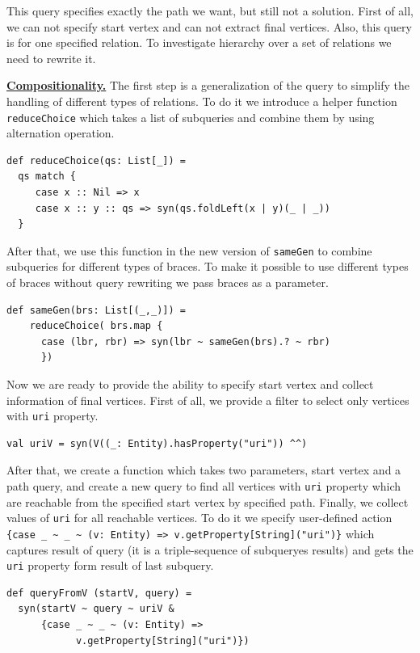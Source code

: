 This query specifies exactly the path we want, but still not a solution.
First of all, we can not specify start vertex and can not extract final vertices.
Also, this query is for one specified relation.
To investigate hierarchy over a set of relations we need to rewrite it.

\underline{\textbf{Compositionality.}}
The first step is a generalization of the query to simplify the handling of different types of relations.
To do it we introduce a helper function \verb|reduceChoice| which takes a list of subqueries and combine them by using alternation operation.

\begin{lstlisting}
def reduceChoice(qs: List[_]) =
  qs match {
     case x :: Nil => x
     case x :: y :: qs => syn(qs.foldLeft(x | y)(_ | _))
  }
\end{lstlisting}

After that, we use this function in the new version of \verb|sameGen| to combine subqueries for different types of braces.
To make it possible to use different types of braces without query rewriting we pass braces as a parameter.

\begin{lstlisting}
def sameGen(brs: List[(_,_)]) =
    reduceChoice( brs.map {
      case (lbr, rbr) => syn(lbr ~ sameGen(brs).? ~ rbr)
      })
\end{lstlisting}

Now we are ready to provide the ability to specify start vertex and collect information of final vertices.
First of all, we provide a filter to select only vertices with \verb|uri| property.

\begin{lstlisting}
val uriV = syn(V((_: Entity).hasProperty("uri")) ^^)
\end{lstlisting}

After that, we create a function which takes two parameters, start vertex and a path query, and create a new query to find all vertices with \verb|uri| property which are reachable from the specified start vertex by specified path.
Finally, we collect values of \verb|uri| for all reachable vertices.
To do it we specify user-defined action {\small \verb|{case _ ~ _ ~ (v: Entity) => v.getProperty[String]("uri")}|} which captures result of query (it is a triple-sequence of subqueryes results) and gets the \verb|uri| property form result of last subquery.

\begin{lstlisting}
def queryFromV (startV, query) =
  syn(startV ~ query ~ uriV &
      {case _ ~ _ ~ (v: Entity) =>
            v.getProperty[String]("uri")})
\end{lstlisting}


